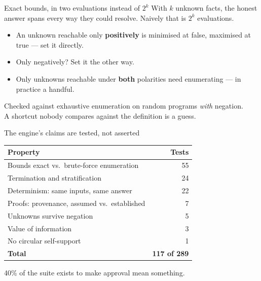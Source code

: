 \documentclass[aspectratio=169,11pt]{beamer}
\begin{document}
\begin{frame}{Exact bounds, in two evaluations instead of $2^k$}
  \vspace{1em}
  With $k$ unknown facts, the honest answer spans every way they could resolve.
  Naively that is $2^{k}$ evaluations.
  \vspace{1.2em}
  \begin{itemize}
    \setlength\itemsep{.65em}
    \item An unknown reachable only \textbf{positively} is minimised at false,
      maximised at true --- set it directly.
    \item Only negatively? Set it the other way.
    \item Only unknowns reachable under \textbf{both} polarities need
      enumerating --- in practice a handful.
  \end{itemize}
  \vspace{1.3em}
  \pause
  \begin{center}\color{pinedark}
    Checked against exhaustive enumeration on random programs \emph{with}
    negation.\\
    {\color{muted}A shortcut nobody compares against the definition is a guess.}
  \end{center}
\end{frame}

\begin{frame}{The engine's claims are tested, not asserted}
  \vspace{.8em}
  \begin{center}
  \begin{tabular}{lr}
    \toprule
    \textbf{Property} & \textbf{Tests} \\
    \midrule
    Bounds exact vs.\ brute-force enumeration   & 55 \\
    Termination and stratification              & 24 \\
    Determinism: same inputs, same answer       & 22 \\
    Proofs: provenance, assumed vs.\ established & 7 \\
    Unknowns survive negation                   & 5 \\
    Value of information                        & 3 \\
    No circular self-support                    & 1 \\
    \midrule
    \textbf{Total} & \textbf{117 of 289} \\
    \bottomrule
  \end{tabular}
  \end{center}
  \vspace{1em}
  \begin{center}\color{muted}\small
    40\% of the suite exists to make approval mean something.
  \end{center}
\end{frame}
\end{document}
